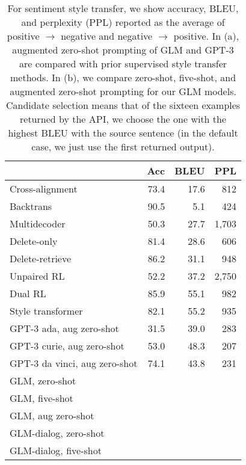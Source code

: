 
\begin{table*}
\caption{
For sentiment style transfer, we show accuracy, BLEU, and perplexity (PPL) reported as the average of positive $\rightarrow$ negative and negative $\rightarrow$ positive. 
In (a), augmented zero-shot prompting of GLM and GPT-3 are compared with prior supervised style transfer methods.
In (b), we compare zero-shot, five-shot, and augmented zero-shot prompting for our GLM models. 
Candidate selection means that of the sixteen examples returned by the API, we choose the one with the highest BLEU with the source sentence (in the default case, we just use the first returned output).  
}
    \setlength{\tabcolsep}{2pt}
    \begin{subtable}{.58\linewidth}
    \centering \small 
        \begin{tabular}{l r r r}
        \toprule
         & Acc & BLEU & PPL\\
        \midrule
        Cross-alignment \citep{NIPS2017_2d2c8394} & 73.4 & 17.6 & 812 \\
        Backtrans \citep{prabhumoye-etal-2018-style} & 90.5 & 5.1 & 424 \\
        Multidecoder \citep{AAAI1817015}  & 50.3 & 27.7 & 1,703\\
        Delete-only \citep{li-etal-2018-delete} & 81.4 & 28.6 & 606 \\
        Delete-retrieve \citep{li-etal-2018-delete} & 86.2 & 31.1 & 948\\
        Unpaired RL \citep{xu-etal-2018-unpaired} & 52.2 & 37.2 & 2,750\\
        Dual RL \citep{DBLP:conf/ijcai/LuoLZYCSS19} & 85.9 & 55.1 & 982\\
        Style transformer \citep{dai-etal-2019-style} & 82.1 & 55.2 & 935\\
        \midrule
        GPT-3 ada, aug zero-shot& 31.5 & 39.0 & 283\\
        GPT-3 curie, aug zero-shot& 53.0 & 48.3 & 207\\
        GPT-3 da vinci, aug zero-shot& 74.1 & 43.8 & 231\\
        \midrule
        GLM, zero-shot \\ 
        GLM, five-shot \\
        GLM, aug zero-shot \\
        \midrule
        GLM-dialog, zero-shot \\
        GLM-dialog, five-shot \\

\end{tabular}
\end{subtable}
\end{table*}
